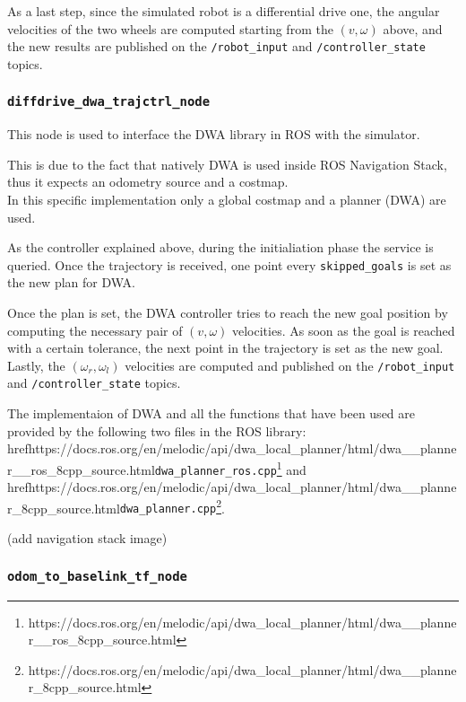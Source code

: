 \documentclass[11pt,a4paper]{article}
\begin{document}
As a last step, since the simulated robot is a differential drive one, the angular velocities of the two wheels are computed starting from the $(v, \omega)$ above, and the new results are published on the \texttt{/robot\_input} and \texttt{/controller\_state} topics.

\subsubsection{\texttt{diffdrive\_dwa\_trajctrl\_node}}

This node is used to interface the DWA library in ROS with the simulator.

This is due to the fact that natively DWA is used inside ROS Navigation Stack, thus it expects an odometry source and a costmap.\\

In this specific implementation only a global costmap and a planner (DWA) are used.

As the controller explained above, during the initialiation phase the service is queried. Once the trajectory is received, one point every \texttt{skipped\_goals} is set as the new plan for DWA.

Once the plan is set, the DWA controller tries to reach the new goal position by computing the necessary pair of $(v, \omega)$ velocities. As soon as the goal is reached with a certain tolerance, the next point in the trajectory is set as the new goal.\\

Lastly, the $(\omega_r,\omega_l)$ velocities are computed and published on the \texttt{/robot\_input} and \texttt{/controller\_state} topics.

The implementaion of DWA and all the functions that have been used are provided by the following two files in the ROS library:
href{https://docs.ros.org/en/melodic/api/dwa\_local\_planner/html/dwa\_\_planner\_\_ros\_8cpp\_source.html}{\texttt{dwa\_planner\_ros.cpp}}\footnote{https://docs.ros.org/en/melodic/api/dwa\_local\_planner/html/dwa\_\_planner\_\_ros\_8cpp\_source.html} and href{https://docs.ros.org/en/melodic/api/dwa\_local\_planner/html/dwa\_\_planner\_8cpp\_source.html}{\texttt{dwa\_planner.cpp}}\footnote{https://docs.ros.org/en/melodic/api/dwa\_local\_planner/html/dwa\_\_planner\_8cpp\_source.html}.

(add navigation stack image)

\subsubsection{\texttt{odom\_to\_baselink\_tf\_node}}
\end{document}

